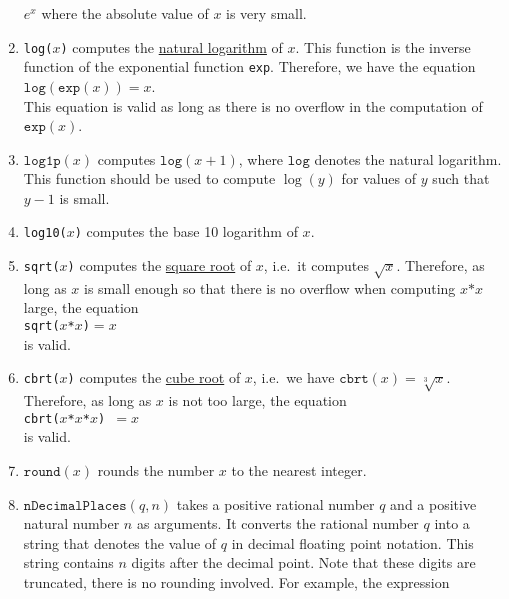 \begin{enumerate}
      $e^x$ where the absolute value of $x$ is very small.
\item \texttt{log($x$)} computes the 
      \href{https://en.wikipedia.org/wiki/Natural_logarithm}{natural logarithm} of $x$.  This function is the
      inverse function of the exponential function \texttt{exp}.  Therefore, we have
      the equation
      \\[0.2cm]
      \hspace*{1.3cm}
      $\mathtt{log}(\mathtt{exp}(x)) = x$.
      \\[0.2cm]
      This equation is valid as long as there is no overflow in the computation of
      $\mathtt{exp}(x)$.
\item $\mathtt{log1p}(x)$ computes $\mathtt{log}(x + 1)$, where $\mathtt{log}$ denotes the natural
      logarithm.  This function should be used to compute $\log(y)$ for values of $y$ such that $y - 1$ is small.
\item \texttt{log10($x$)} computes the base 10 logarithm of $x$.
\item \texttt{sqrt($x$)} computes the \href{https://en.wikipedia.org/wiki/Square_root}{square root}
      of $x$, i.e.~it computes $\sqrt{x}$.  Therefore, as long as $x$ is small enough so that there
      is no overflow when computing $x\mathtt{*}x$ large, the equation 
      \\[0.2cm]
      \hspace*{1.3cm}
      \texttt{sqrt($x$*$x$)$=x$}
      \\[0.2cm]
      is valid.
\item \texttt{cbrt($x$)} computes the \href{https://en.wikipedia.org/wiki/Cube_root}{cube root} of
      $x$, i.e.~we have $\mathtt{cbrt}(x) = \sqrt[3]{x}$.  Therefore, as long as $x$ is not too large, the equation
      \\[0.2cm]
      \hspace*{1.3cm}
      \texttt{cbrt($x$*$x$*$x$) $= x$}
      \\[0.2cm]
      is valid.
\item $\texttt{round}(x)$ rounds the number $x$ to the nearest integer.
\item $\texttt{nDecimalPlaces}(q, n)$ takes a positive rational number $q$ and a positive natural
      number $n$ as arguments.  It converts the rational number $q$ into a string that denotes the
      value of $q$ in decimal floating point notation.  This string contains $n$ digits after the
      decimal point.  Note that these digits are truncated, there is no rounding
      involved.  For example, the expression

\end{enumerate}
